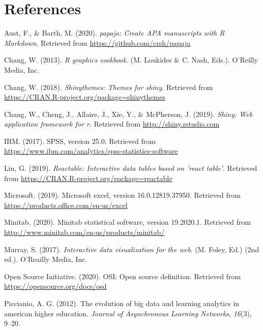 \documentclass[english,man,floatsintext]{apa6}
\begin{document}
\newpage

\hypertarget{references}{%
\section{References}\label{references}}

\begingroup
\setlength{\parindent}{-0.5in}
\setlength{\leftskip}{0.5in}

\hypertarget{refs}{}
\leavevmode\hypertarget{ref-R-papaja}{}%
Aust, F., \& Barth, M. (2020). \emph{papaja: Create APA manuscripts with R Markdown}. Retrieved from \url{https://github.com/crsh/papaja}

\leavevmode\hypertarget{ref-cook-graphs}{}%
Chang, W. (2013). \emph{R graphics cookbook}. (M. Loukides \& C. Nash, Eds.). O'Reilly Media, Inc.

\leavevmode\hypertarget{ref-R-shinythemes}{}%
Chang, W. (2018). \emph{Shinythemes: Themes for shiny}. Retrieved from \url{https://CRAN.R-project.org/package=shinythemes}

\leavevmode\hypertarget{ref-R-shiny}{}%
Chang, W., Cheng, J., Allaire, J., Xie, Y., \& McPherson, J. (2019). \emph{Shiny: Web application framework for r}. Retrieved from \url{http://shiny.rstudio.com}

\leavevmode\hypertarget{ref-spss}{}%
IBM. (2017). SPSS, version 25.0. Retrieved from \url{https://www.ibm.com/analytics/spss-statistics-software}

\leavevmode\hypertarget{ref-R-reactable}{}%
Lin, G. (2019). \emph{Reactable: Interactive data tables based on 'react table'}. Retrieved from \url{https://CRAN.R-project.org/package=reactable}

\leavevmode\hypertarget{ref-excel}{}%
Microsoft. (2019). Microsoft excel, version 16.0.12819.37950. Retrieved from \url{https://products.office.com/en-us/excel}

\leavevmode\hypertarget{ref-minitab}{}%
Minitab. (2020). Minitab statistical software, version 19.2020.1. Retrieved from \url{http://www.minitab.com/en-us/products/minitab/}

\leavevmode\hypertarget{ref-datavis1}{}%
Murray, S. (2017). \emph{Interactive data visualization for the web}. (M. Foley, Ed.) (2nd ed.). O'Reailly Media, Inc.

\leavevmode\hypertarget{ref-osd}{}%
Open Source Initiative. (2020). OSI: Open source definition. Retrieved from \url{https://opensource.org/docs/osd}

\leavevmode\hypertarget{ref-bigdata1}{}%
Piccianio, A. G. (2012). The evolution of big data and learning analytics in american higher education. \emph{Journal of Asynchronous Learning Networks}, \emph{16}(3), 9--20.
\end{document}
